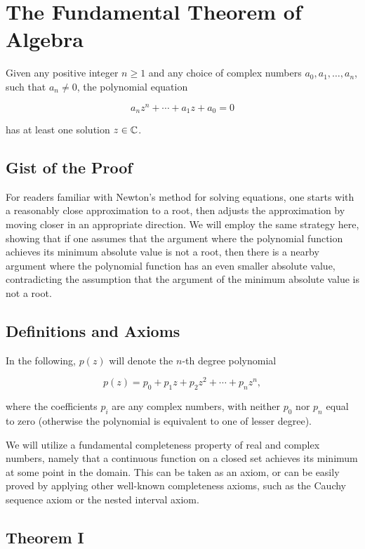 \newpage
\section{The Fundamental Theorem of Algebra}

Given any positive integer \(n \geq 1\) and any choice of complex numbers \(a_0, a_1, \ldots, a_n\), 
such that \(a_n \neq 0\), the polynomial equation

\[
	a_n z^n + \cdots + a_1 z + a_0 = 0 
\]

has at least one solution \(z \in \mathbb{C}\).

\subsection{Gist of the Proof}

For readers familiar with Newton’s method for solving equations, one starts with a reasonably close 
approximation to a root, then adjusts the approximation by moving closer in an appropriate direction. 
We will employ the same strategy here, showing that if one assumes that the argument where the polynomial 
function achieves its minimum absolute value is not a root, then there is a nearby argument where the 
polynomial function has an even smaller absolute value, contradicting the assumption that the argument of 
the minimum absolute value is not a root.

\subsection{Definitions and Axioms}

In the following, \(p(z)\) will denote the \(n\)-th degree polynomial

\[
	p(z) = p_0 + p_1 z + p_2 z^2 + \cdots + p_n z^n,
\]

where the coefficients \(p_i\) are any complex numbers, with neither \(p_0\) nor \(p_n\) equal to zero 
(otherwise the polynomial is equivalent to one of lesser degree).

We will utilize a fundamental completeness property of real and complex numbers, namely that a continuous 
function on a closed set achieves its minimum at some point in the domain. This can be taken as an axiom, 
or can be easily proved by applying other well-known completeness axioms, such as the Cauchy sequence 
axiom or the nested interval axiom.

\subsection{Theorem I}

